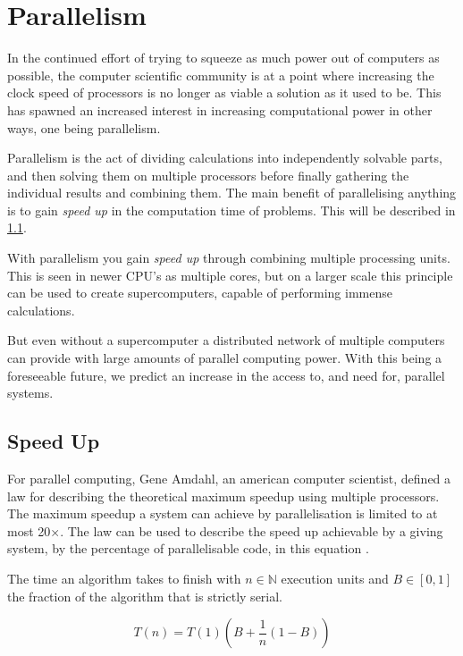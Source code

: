 \section{Parallelism}\label{sec:parallelism}

In the continued effort of trying to squeeze as much power out of computers as possible, the computer scientific community is at a point where increasing the clock speed of processors is no longer as viable a solution as it used to be. This has spawned an increased interest in increasing computational power in other ways, one being parallelism.

Parallelism is the act of dividing calculations into independently solvable parts, and then solving them on multiple processors before finally gathering the individual results and combining them. The main benefit of parallelising anything is to gain \emph{speed up} in the computation time of problems. This will be described in \cref{sup}.

With parallelism you gain \emph{speed up} through combining multiple processing units. This is seen in newer CPU's as multiple cores, but on a larger scale this principle can be used to create supercomputers, capable of performing immense calculations.

But even without a supercomputer a distributed network of multiple computers can provide with large amounts of parallel computing power. With this being a foreseeable future, we predict an increase in the access to, and need for, parallel systems.

\subsection{Speed Up}\label{sup}

For parallel computing, Gene Amdahl, an american computer scientist, defined a law for describing the theoretical maximum speedup using multiple processors. The maximum speedup a system can achieve by parallelisation is limited to at most 20×.
The law can be used to describe the speed up achievable by a giving system, by the percentage of parallelisable code, in this equation \cite{wiki_amdahl}.

The time an algorithm takes to finish with $n \in \mathbb{N}$ execution units and $B \in [0, 1]$ the fraction of the algorithm that is strictly serial.

\begin{equation}
  T(n) = T(1)(B + \frac{1}{n} (1 - B))
\end{equation}

